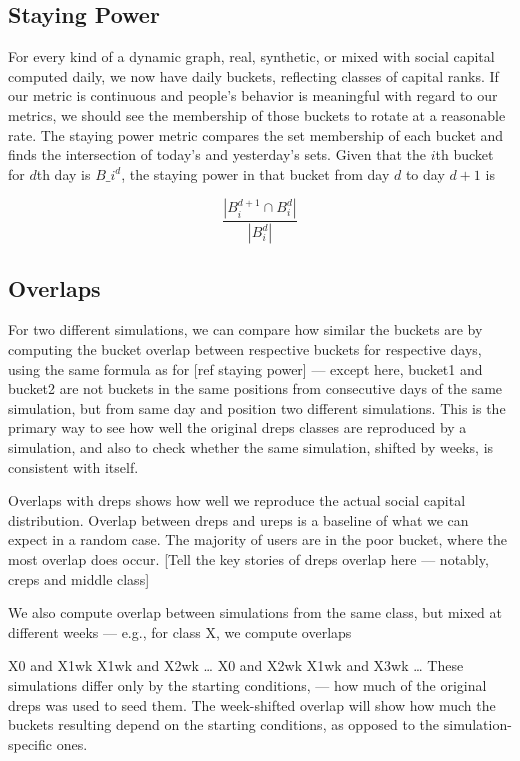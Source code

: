 \documentclass[10pt,oneside]{memoir}
\begin{document}
\subsection{Staying Power}
\label{stayingpower}

For every kind of a dynamic graph, real, synthetic, or mixed with social capital computed daily, we now have daily buckets, reflecting classes of capital ranks.  If our metric is continuous and people's behavior is meaningful with regard to our metrics, we should see the membership of those buckets to rotate at a reasonable rate.  The staying power metric compares the set membership of each bucket and finds the intersection of today's and yesterday's sets.  Given that the $i$th bucket for $d$th day is $B\_i^d$, the staying power in that bucket from day $d$ to day $d+1$ is

\[ \frac{|B_i^{d+1} \cap B_i^d|}{|B_i^d|} \]



\subsection{Overlaps}
\label{overlaps}

For two different simulations, we can compare how similar the buckets are by computing the bucket overlap between respective buckets for respective days, using the same formula as for [ref staying power] --- except here, bucket1 and bucket2 are not buckets in the same positions from consecutive days of the same simulation,  but from same day and position two different simulations.  This is the primary way to see how well the original dreps classes are reproduced by a simulation, and also to check whether the same simulation, shifted by weeks, is consistent with itself.


Overlaps with dreps shows how well we reproduce the actual social capital distribution.  Overlap between dreps and ureps is a baseline of what we can expect in a random case.  The majority of users are in the poor bucket, where the most overlap does occur.
[Tell the key stories of dreps overlap here --- notably, creps and middle class]


We also compute overlap between simulations from the same class, but mixed at different weeks --- e.g., for class X, we compute overlaps


X0 and X1wk
X1wk and X2wk
{\ldots}
X0 and X2wk
X1wk and X3wk
{\ldots}
These simulations differ only by the starting conditions, --- how much of the original dreps was used to seed them.  The week-shifted overlap will show how much the buckets resulting depend on the starting conditions, as opposed to the simulation-specific ones.
\end{document}
